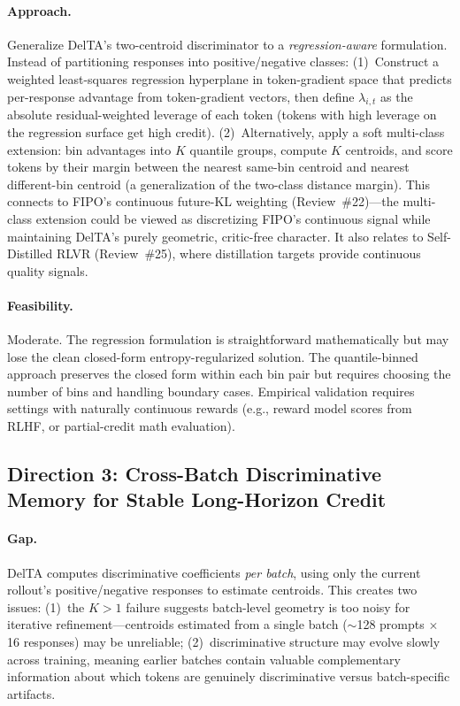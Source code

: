 \documentclass[11pt,a4paper]{article}
\begin{document}
\paragraph{Approach.}
Generalize DelTA's two-centroid discriminator to a \emph{regression-aware} formulation. Instead of partitioning responses into positive/negative classes: (1)~Construct a weighted least-squares regression hyperplane in token-gradient space that predicts per-response advantage from token-gradient vectors, then define $\lambda_{i,t}$ as the absolute residual-weighted leverage of each token (tokens with high leverage on the regression surface get high credit). (2)~Alternatively, apply a soft multi-class extension: bin advantages into $K$ quantile groups, compute $K$ centroids, and score tokens by their margin between the nearest same-bin centroid and nearest different-bin centroid (a generalization of the two-class distance margin). This connects to FIPO's continuous future-KL weighting (Review~\#22)---the multi-class extension could be viewed as discretizing FIPO's continuous signal while maintaining DelTA's purely geometric, critic-free character. It also relates to Self-Distilled RLVR (Review~\#25), where distillation targets provide continuous quality signals.

\paragraph{Feasibility.}
Moderate. The regression formulation is straightforward mathematically but may lose the clean closed-form entropy-regularized solution. The quantile-binned approach preserves the closed form within each bin pair but requires choosing the number of bins and handling boundary cases. Empirical validation requires settings with naturally continuous rewards (e.g., reward model scores from RLHF, or partial-credit math evaluation).

\subsection*{Direction 3: Cross-Batch Discriminative Memory for Stable Long-Horizon Credit}

\paragraph{Gap.}
DelTA computes discriminative coefficients \emph{per batch}, using only the current rollout's positive/negative responses to estimate centroids. This creates two issues: (1)~the $K > 1$ failure suggests batch-level geometry is too noisy for iterative refinement---centroids estimated from a single batch ($\sim$128 prompts $\times$ 16 responses) may be unreliable; (2)~discriminative structure may evolve slowly across training, meaning earlier batches contain valuable complementary information about which tokens are genuinely discriminative versus batch-specific artifacts.
\end{document}
